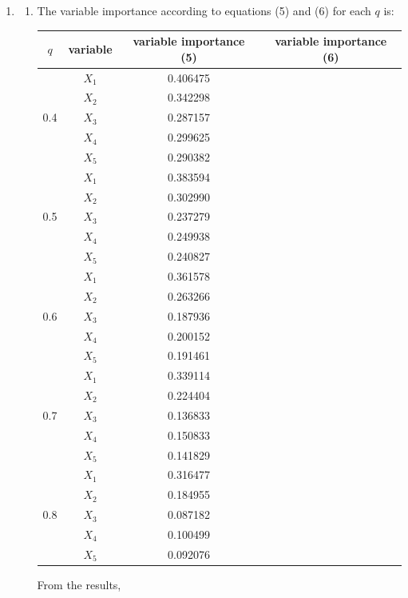 \documentclass[paper=letter, fontsize=12pt]{article}
\begin{document}
\begin{enumerate}[label=(\alph*)]
\begin{enumerate}[label=(\roman*)]
	\end{enumerate}

	\item 
	\begin{enumerate}[label=(\roman*)]
		\item The variable importance according to equations (5) and (6) for each $q$ is:
		
		\begin{longtable}{|c|c|c|c|}
			\hline
			$q$ & variable & variable importance (5) & variable importance (6) \\ \hline
			\multirow{5}{1em}{0.4} & $X_1$ & 0.406475 & \\ 
			& $X_2$ & 0.342298 & \\
			& $X_3$ & 0.287157 & \\
			& $X_4$ & 0.299625 & \\
			& $X_5$ & 0.290382 & \\
			\hline
			\multirow{5}{1em}{0.5} & $X_1$ & 0.383594 & \\ 
			& $X_2$ & 0.302990 & \\
			& $X_3$ & 0.237279 & \\
			& $X_4$ & 0.249938 & \\
			& $X_5$ & 0.240827 & \\
			\hline
			\multirow{5}{1em}{0.6} & $X_1$ & 0.361578 & \\ 
			& $X_2$ & 0.263266 & \\
			& $X_3$ & 0.187936 & \\
			& $X_4$ & 0.200152 & \\
			& $X_5$ & 0.191461 & \\
			\hline
			\multirow{5}{1em}{0.7} & $X_1$ & 0.339114 & \\ 
			& $X_2$ & 0.224404 & \\
			& $X_3$ & 0.136833 & \\
			& $X_4$ & 0.150833 & \\
			& $X_5$ & 0.141829 & \\
			\hline
			\multirow{5}{1em}{0.8} & $X_1$ & 0.316477 & \\ 
			& $X_2$ & 0.184955 & \\
			& $X_3$ & 0.087182 &\\
			& $X_4$ & 0.100499 & \\
			& $X_5$ & 0.092076 & \\
			\hline
		\end{longtable}
		
		From the results, 
		

\end{enumerate}
\end{enumerate}
\end{document}
